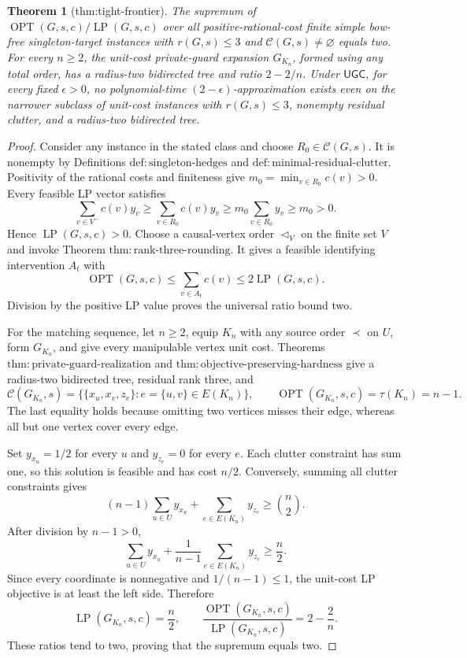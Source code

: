 \documentclass{article}
\newtheorem{theorem}{Theorem}
\begin{document}
\begin{theorem}[thm:tight-frontier]\label{thm:tight-frontier}
The supremum of \(\operatorname{OPT}(G,s,c)/\operatorname{LP}(G,s,c)\) over all positive-rational-cost finite simple bow-free singleton-target instances with \(r(G,s)\leq3\) and \(\mathcal C(G,s)\neq\varnothing\) equals two. For every \(n\geq2\), the unit-cost private-guard expansion \(G_{K_n}\), formed using any total order, has a radius-two bidirected tree and ratio \(2-2/n\). Under \(\mathsf{UGC}\), for every fixed \(\epsilon>0\), no polynomial-time \((2-\epsilon)\)-approximation exists even on the narrower subclass of unit-cost instances with \(r(G,s)\leq3\), nonempty residual clutter, and a radius-two bidirected tree.
\end{theorem}
\begin{proof}
Consider any instance in the stated class and choose
\(R_0\in\mathcal C(G,s)\).  It is nonempty by Definitions
\(\mathrm{def{:}singleton\mbox{-}hedges}\) and
\(\mathrm{def{:}minimal\mbox{-}residual\mbox{-}clutter}\).  Positivity of
the rational costs and finiteness give
\(m_0=\min_{v\in R_0}c(v)>0\).  Every feasible LP vector satisfies
\[
 \sum_{v\in V^{-}}c(v)y_v
 \geq\sum_{v\in R_0}c(v)y_v
 \geq m_0\sum_{v\in R_0}y_v
 \geq m_0>0.
\]
Hence \(\operatorname{LP}(G,s,c)>0\).  Choose a causal-vertex order
\(\triangleleft_V\) on the finite set \(V\) and invoke Theorem
\(\mathrm{thm{:}rank\mbox{-}three\mbox{-}rounding}\).  It gives a feasible
identifying intervention \(A_t\) with
\[
 \operatorname{OPT}(G,s,c)
 \leq\sum_{v\in A_t}c(v)
 \leq2\operatorname{LP}(G,s,c).
\]
Division by the positive LP value proves the universal ratio bound two.

For the matching sequence, let \(n\geq2\), equip \(K_n\) with any source
order \(\prec\) on \(U\), form \(G_{K_n}\), and give every manipulable
vertex unit cost.  Theorems
\(\mathrm{thm{:}private\mbox{-}guard\mbox{-}realization}\) and
\(\mathrm{thm{:}objective\mbox{-}preserving\mbox{-}hardness}\) give a
radius-two bidirected tree, residual rank three, and
\[
 \mathcal C(G_{K_n},s)
 =\bigl\{\{x_u,x_v,z_e\}:e=\{u,v\}\in E(K_n)\bigr\},
 \qquad
 \operatorname{OPT}(G_{K_n},s,c)=\tau(K_n)=n-1.
\]
The last equality holds because omitting two vertices misses their edge,
whereas all but one vertex cover every edge.

Set \(y_{x_u}=1/2\) for every \(u\) and \(y_{z_e}=0\) for every \(e\).
Each clutter constraint has sum one, so this solution is feasible and has
cost \(n/2\).  Conversely, summing all clutter constraints gives
\[
 (n-1)\sum_{u\in U}y_{x_u}+\sum_{e\in E(K_n)}y_{z_e}
 \geq\binom n2.
\]
After division by \(n-1>0\),
\[
 \sum_{u\in U}y_{x_u}
 +\frac1{n-1}\sum_{e\in E(K_n)}y_{z_e}\geq\frac n2.
\]
Since every coordinate is nonnegative and \(1/(n-1)\leq1\), the unit-cost
LP objective is at least the left side.  Therefore
\[
 \operatorname{LP}(G_{K_n},s,c)=\frac n2,
 \qquad
 \frac{\operatorname{OPT}(G_{K_n},s,c)}
      {\operatorname{LP}(G_{K_n},s,c)}
 =2-\frac2n.
\]
These ratios tend to two, proving that the supremum equals two.


\end{proof}
\end{document}
